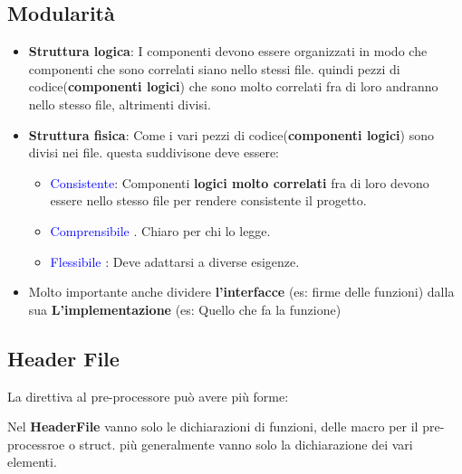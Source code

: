 \subsection{Modularità}
\begin{itemize}
    \item \textbf{Struttura logica}: I componenti devono essere organizzati in modo che componenti che sono correlati siano nello stessi file. \newline
    quindi pezzi di codice(\textbf{componenti logici}) che sono molto correlati fra di loro andranno nello stesso file, altrimenti divisi.

    \item \textbf{Struttura fisica}: Come i vari pezzi di codice(\textbf{componenti logici}) sono divisi nei file. \newline
    questa suddivisone deve essere: 
    
    \begin{itemize} 
        \item \textcolor{blue}{Consistente}: Componenti \textbf{logici molto correlati} fra di loro devono  essere nello stesso file per rendere consistente il progetto. 
        \item \textcolor{blue}{Comprensibile} . Chiaro per chi lo legge.
        \item \textcolor{blue}{Flessibile} : Deve adattarsi a diverse esigenze. 
    \end{itemize}

    \item Molto importante anche dividere \textbf{l'interfacce} (es: firme delle funzioni)  dalla sua \textbf{L'implementazione} (es: Quello che fa la funzione) 
    
\end{itemize}

\subsection{Header File}
La direttiva al pre-processore  può avere più forme: \newline

Nel \textbf{HeaderFile} vanno solo le dichiarazioni di funzioni, delle macro per il pre-processroe o struct.
più generalmente vanno solo la dichiarazione dei vari elementi.

